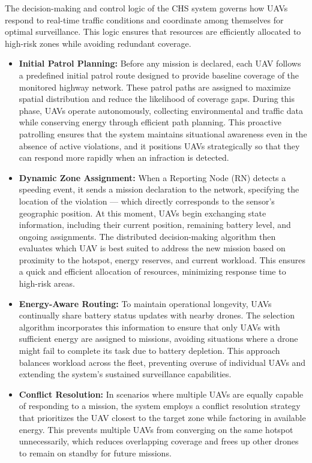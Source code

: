 The decision-making and control logic of the CHS system governs how UAVs respond to real-time traffic conditions and coordinate among themselves for optimal surveillance. This logic ensures that resources are efficiently allocated to high-risk zones while avoiding redundant coverage.

\begin{itemize}
    \item \textbf{Initial Patrol Planning:}  
    Before any mission is declared, each UAV follows a predefined initial patrol route designed to provide baseline coverage of the monitored highway network. These patrol paths are assigned to maximize spatial distribution and reduce the likelihood of coverage gaps. During this phase, UAVs operate autonomously, collecting environmental and traffic data while conserving energy through efficient path planning. This proactive patrolling ensures that the system maintains situational awareness even in the absence of active violations, and it positions UAVs strategically so that they can respond more rapidly when an infraction is detected.

    \item \textbf{Dynamic Zone Assignment:}  
    When a Reporting Node (RN) detects a speeding event, it sends a mission declaration to the network, specifying the location of the violation — which directly corresponds to the sensor’s geographic position. At this moment, UAVs begin exchanging state information, including their current position, remaining battery level, and ongoing assignments. The distributed decision-making algorithm then evaluates which UAV is best suited to address the new mission based on proximity to the hotspot, energy reserves, and current workload. This ensures a quick and efficient allocation of resources, minimizing response time to high-risk areas.

    \item \textbf{Energy-Aware Routing:}  
    To maintain operational longevity, UAVs continually share battery status updates with nearby drones. The selection algorithm incorporates this information to ensure that only UAVs with sufficient energy are assigned to missions, avoiding situations where a drone might fail to complete its task due to battery depletion. This approach balances workload across the fleet, preventing overuse of individual UAVs and extending the system’s sustained surveillance capabilities.

    \item \textbf{Conflict Resolution:}  
    In scenarios where multiple UAVs are equally capable of responding to a mission, the system employs a conflict resolution strategy that prioritizes the UAV closest to the target zone while factoring in available energy. This prevents multiple UAVs from converging on the same hotspot unnecessarily, which reduces overlapping coverage and frees up other drones to remain on standby for future missions.


\end{itemize}
